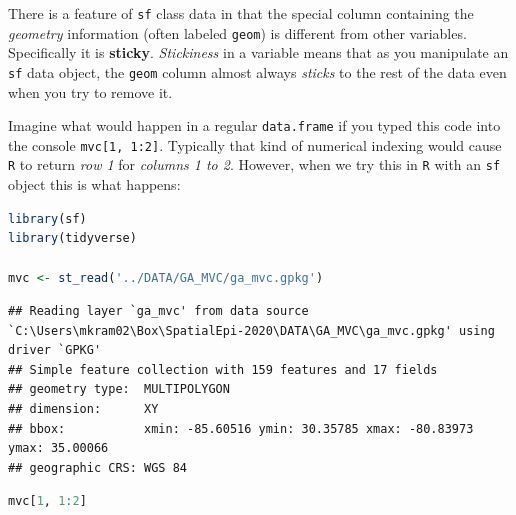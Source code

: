 \documentclass[
]{book}
\newcommand{\passthrough}[1]{#1}
\begin{document}
There is a feature of \passthrough{\lstinline!sf!} class data in that the special column containing the \emph{geometry} information (often labeled \passthrough{\lstinline!geom!}) is different from other variables. Specifically it is \textbf{sticky}. \emph{Stickiness} in a variable means that as you manipulate an \passthrough{\lstinline!sf!} data object, the \passthrough{\lstinline!geom!} column almost always \emph{sticks} to the rest of the data even when you try to remove it.

Imagine what would happen in a regular \passthrough{\lstinline!data.frame!} if you typed this code into the console \passthrough{\lstinline!mvc[1, 1:2]!}. Typically that kind of numerical indexing would cause \passthrough{\lstinline!R!} to return \emph{row 1} for \emph{columns 1 to 2}. However, when we try this in \passthrough{\lstinline!R!} with an \passthrough{\lstinline!sf!} object this is what happens:

\begin{lstlisting}[language=R]
library(sf)
library(tidyverse)

mvc <- st_read('../DATA/GA_MVC/ga_mvc.gpkg')
\end{lstlisting}

\begin{lstlisting}
## Reading layer `ga_mvc' from data source `C:\Users\mkram02\Box\SpatialEpi-2020\DATA\GA_MVC\ga_mvc.gpkg' using driver `GPKG'
## Simple feature collection with 159 features and 17 fields
## geometry type:  MULTIPOLYGON
## dimension:      XY
## bbox:           xmin: -85.60516 ymin: 30.35785 xmax: -80.83973 ymax: 35.00066
## geographic CRS: WGS 84
\end{lstlisting}

\begin{lstlisting}[language=R]
mvc[1, 1:2]
\end{lstlisting}

 
  \providecommand{\huxb}[2]{\arrayrulecolor[RGB]{#1}\global\arrayrulewidth=#2pt}
  \providecommand{\huxvb}[2]{\color[RGB]{#1}\vrule width #2pt}
  \providecommand{\huxtpad}[1]{\rule{0pt}{#1}}
  \providecommand{\huxbpad}[1]{\rule[-#1]{0pt}{#1}}
\end{document}
